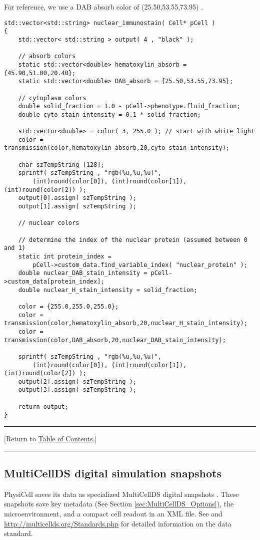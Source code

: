 \documentclass[12pt]{article}
\newcommand{\blue}[1]{\textcolor{blue}{#1}}
\newcommand{\DONE}{}%
\newcommand{\TOClink}{\begin{center}\hrule\vskip-10pt\phantom{.}\hfill[Return to \hyperlink{TOC}{Table of Contents}.]\hfill\phantom{.}\vskip3pt\hrule\end{center}}
\begin{document}
For reference, we use a DAB absorb color of 
(25.50,53.55,73.95) \cite{ref:H_and_E}. 
\begin{verbatim}
std::vector<std::string> nuclear_immunostain( Cell* pCell )
{
    std::vector< std::string > output( 4 , "black" ); 
 
    // absorb colors 
    static std::vector<double> hematoxylin_absorb = {45.90,51.00,20.40};
    static std::vector<double> DAB_absorb = {25.50,53.55,73.95};
 
    // cytoplasm colors 
    double solid_fraction = 1.0 - pCell->phenotype.fluid_fraction; 
    double cyto_stain_intensity = 0.1 * solid_fraction; 
  
    std::vector<double> = color( 3, 255.0 ); // start with white light 
    color = transmission(color,hematoxylin_absorb,20,cyto_stain_intensity);  
 
    char szTempString [128]; 
    sprintf( szTempString , "rgb(%u,%u,%u)", 
        (int)round(color[0]), (int)round(color[1]), (int)round(color[2]) ); 
    output[0].assign( szTempString ); 
    output[1].assign( szTempString ); 
 
    // nuclear colors 

    // determine the index of the nuclear protein (assumed between 0 and 1)
    static int protein_index = 
        pCell->custom_data.find_variable_index( "nuclear_protein" ); 
    double nuclear_DAB_stain_intensity = pCell->custom_data[protein_index]; 
    double nuclear_H_stain_intensity = solid_fraction; 

    color = {255.0,255.0,255.0}; 
    color = transmission(color,hematoxylin_absorb,20,nuclear_H_stain_intensity);
    color = transmission(color,DAB_absorb,20,nuclear_DAB_stain_intensity);
 
    sprintf( szTempString , "rgb(%u,%u,%u)", 
        (int)round(color[0]), (int)round(color[1]), (int)round(color[2]) ); 
    output[2].assign( szTempString ); 
    output[3].assign( szTempString ); 
 
    return output; 
}
\end{verbatim}

\TOClink

\subsection{MultiCellDS digital simulation snapshots \DONE}
PhysiCell saves its data as specialized MultiCellDS digital 
snapshots \cite{ref:MultiCellDS}. These snapshots save 
key metadata (See Section \ref{sec:MultiCellDS_Options}), 
the microenvironment, and a compact cell readout in an 
XML file. See \cite{ref:MultiCellDS} and 
\href{http://multicellds.org/Standards.php}{http://multicellds.org/Standards.php} 
for detailed information on the data standard. 
\end{document}
